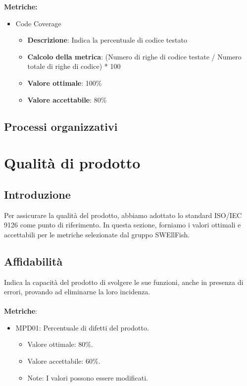 \documentclass[12pt]{article}
\begin{document}
\textbf{Metriche:}
\begin{itemize}
	\item Code Coverage
	      \begin{itemize}
		      \item \textbf{Descrizione}: Indica la percentuale di codice testato
		      \item \textbf{Calcolo della metrica}:  (Numero di righe di codice testate / Numero totale di righe di codice) * 100
		      \item \textbf{Valore ottimale}: 100\%
		      \item \textbf{Valore accettabile}: 80\%
	      \end{itemize}
\end{itemize}

\subsection{Processi organizzativi}

\section{Qualità di prodotto}
\subsection{Introduzione}
Per assicurare la qualità del prodotto, abbiamo adottato lo standard ISO/IEC 9126 come punto di riferimento. In questa sezione, forniamo i valori ottimali e accettabili per le metriche selezionate dal gruppo SWEllFish.



\subsection{Affidabilità}
	Indica la capacità del prodotto di svolgere le sue funzioni, anche in presenza di errori, provando ad eliminarne la loro incidenza.
	\\\\
	\textbf{Metriche}:
	\begin{itemize}
		\item MPD01: Percentuale di difetti del prodotto.
		\begin{itemize}	
			\item Valore ottimale: 80\%.
			\item Valore accettabile: 60\%.
			\item Note: I valori possono essere modificati.
		\end{itemize}
	\end{itemize}
\end{document}
